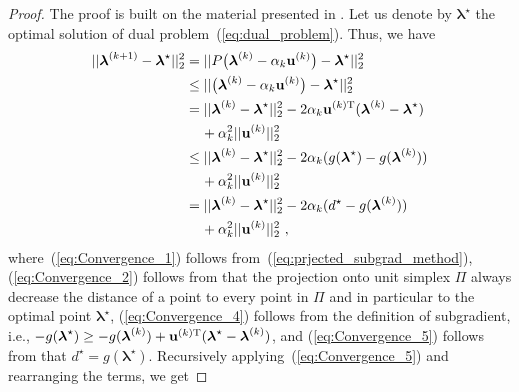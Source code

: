 \documentclass[journal, 10pt, twocolumn]{IEEEtran}
\renewcommand{\vec}[1]{\bf{#1}}     \newcommand{\vecsc}[1]{\mbox {\boldmath \scriptsize $#1$}}     \newcommand{\itvec}[1]{\mbox {\boldmath $#1$}}
\begin{document}
\begin{proof}
The proof is built on the material presented in \cite[\S~3.2]{Boyd-EE364b-SubGradMethods-07}\cite{Bertsekas-99}. Let us denote by ${\boldsymbol\lambda}^\star$ the optimal solution of dual problem~(\ref{eq:dual_problem}). Thus, we have
\begin{subequations}
\begin{align}\label{eq:Convergence_1}
  ||{\boldsymbol\lambda}^{(k+1)}-{\boldsymbol\lambda}^\star||^2_2 & = ||P\big(\boldsymbol{\lambda}^{(k)} - \alpha_k {\vec u}^{(k)}\big)-{\boldsymbol\lambda}^\star||^2_2\\ \label{eq:Convergence_2}
  & \leq ||\big(\boldsymbol{\lambda}^{(k)} - \alpha_k {\vec u}^{(k)}\big)-{\boldsymbol\lambda}^\star||^2_2\\ \label{eq:Convergence_3}
  & = ||\boldsymbol{\lambda}^{(k)} -{\boldsymbol\lambda}^\star||^2_2-2\alpha_k{{\vec u}^{(k)\mbox{\scriptsize T}}}(\boldsymbol{\lambda}^{(k)} -{\boldsymbol\lambda}^\star)\nonumber \\
  & \hspace{4mm} + \alpha^2_k||{\vec u}^{(k)}||^2_2\\ \label{eq:Convergence_4}
  & \leq ||\boldsymbol{\lambda}^{(k)} -{\boldsymbol\lambda}^\star||^2_2-2\alpha_k(g({\boldsymbol\lambda}^\star)-g(\boldsymbol{\lambda}^{(k)}) ) \nonumber \\
  & \hspace{4mm} + \alpha^2_k||{\vec u}^{(k)}||^2_2\\ \label{eq:Convergence_5}
  & =||\boldsymbol{\lambda}^{(k)} -{\boldsymbol\lambda}^\star||^2_2-2\alpha_k(d^\star-g(\boldsymbol{\lambda}^{(k)}) ) \nonumber \\
  & \hspace{4mm} + \alpha^2_k||{\vec u}^{(k)}||^2_2 \ ,
\end{align}
\end{subequations}
where~(\ref{eq:Convergence_1}) follows from~(\ref{eq:prjected_subgrad_method}), (\ref{eq:Convergence_2}) follows from that the projection onto unit simplex $\Pi$ always decrease the distance of a point to every point in $\Pi$ and in particular to the optimal point ${\boldsymbol\lambda}^\star$, (\ref{eq:Convergence_4}) follows from the definition of subgradient, i.e., $-g(\boldsymbol\lambda^\star)\geq -g(\boldsymbol\lambda^{(k)}) + {\vec u}^{(k)\mbox{\scriptsize T}}(\boldsymbol\lambda^\star-\boldsymbol\lambda^{(k)})$, and (\ref{eq:Convergence_5}) follows from that $d^\star = g(\boldsymbol\lambda^\star)$. Recursively applying~(\ref{eq:Convergence_5}) and rearranging the terms, we get

\end{proof}
\end{document}
